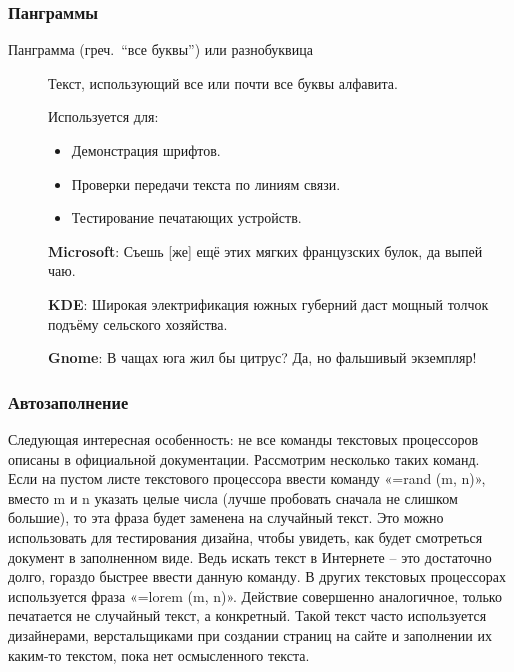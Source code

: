 \subsubsection{Панграммы}\label{subsubsec:pangrams}

\begin{description}
    \item [Панграмма (греч.\ \enquote{все буквы}) или разнобуквица]
          Текст, использующий все или почти все буквы алфавита.

          Используется для:
          \begin{itemize}
              \item Демонстрация шрифтов.
              \item Проверки передачи текста по линиям связи.
              \item Тестирование печатающих устройств.
          \end{itemize}

          \textbf{Microsoft}: Съешь [же] ещё этих мягких французских булок, да выпей чаю.

          \textbf{KDE}: Широкая электрификация южных губерний даст мощный толчок подъёму сельского хозяйства.

          \textbf{Gnome}: В чащах юга жил бы цитрус? Да, но фальшивый экземпляр!

\end{description}

\subsubsection{Автозаполнение}\label{subsubsec:autocomplete}

Следующая интересная особенность: не все команды текстовых процессоров описаны в официальной документации. Рассмотрим несколько таких команд. 
Если на пустом листе текстового процессора ввести команду «=rand (m, n)», вместо m и n указать целые числа (лучше пробовать сначала не слишком большие), то эта фраза будет заменена на случайный текст. Это можно использовать для тестирования дизайна, чтобы увидеть, как будет смотреться документ в заполненном виде. Ведь искать текст в Интернете – это достаточно долго, гораздо быстрее ввести данную команду.
В других текстовых процессорах используется фраза «=lorem (m, n)». Действие совершенно аналогичное, только печатается не случайный текст, а конкретный. Такой текст часто используется дизайнерами, верстальщиками при создании страниц на сайте и заполнении их каким-то текстом, пока нет осмысленного текста. 

